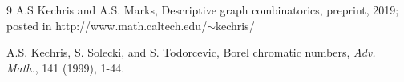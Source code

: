 \begin{thebibliography}{9}
 A.S Kechris and A.S. Marks, Descriptive graph combinatorics, preprint, 2019; posted in \textnormal{http://www.math.caltech.edu/$\sim$kechris/}

 A.S. Kechris, S. Solecki, and S. Todorcevic, Borel chromatic numbers, \textit{Adv. Math.}, 141 (1999), 1-44.
\end{thebibliography}
